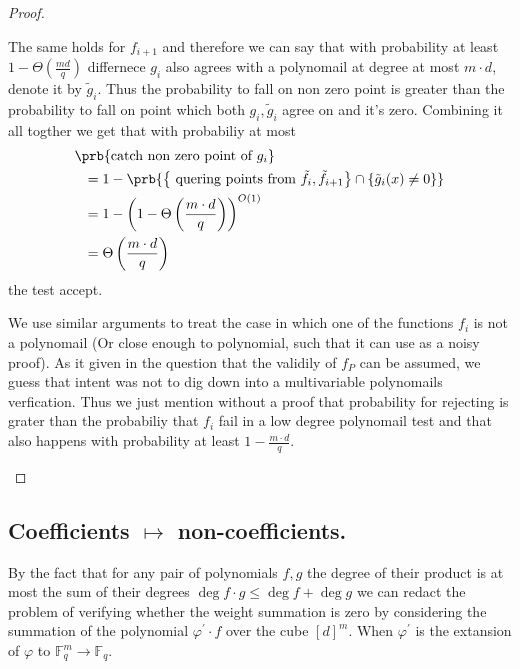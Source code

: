 \documentclass{article}
\newcommand{\FF}{\mathbb{F}_{q}}
\begin{document}
\begin{proof}
\begin{enumerate}
      The same holds for $f_{i+1}$ and therefore we can say that with probability at least $1 - \Theta(\frac{md}{q})$  differnece $g_{i}$ also agrees with a polynomail at degree at most $m\cdot d$, denote it by $\tilde{g}_{i}$. Thus the probability to fall on non zero point is greater than the probability to fall on point which both $g_{i},\tilde{g}_{i}$ agree on and it's zero. Combining it all togther we get that with probabiliy at most 
      \begin{equation*}
        \begin{split}
          & \prb{\text{catch non zero point of } g_{i}} \\
          & \ \ =  1 - \prb{ \left\{ \text{ quering points from } \tilde{f}_{i}, \tilde{f}_{i+1}  \right\} \cap \left\{  \tilde{g}_i(x) \neq 0 \right\} } \\
          & \ \ =  1 - \left( 1 - \Theta\left(\frac{m\cdot d}{q} \right) \right)^{O(1)} \\ 
          & \ \ = \Theta\left(\frac{m\cdot d}{q} \right)
        \end{split}
      \end{equation*}
    the test accept.


      We use similar arguments to treat the case in which one of the functions $f_{i}$ is not a polynomail (Or close enough to polynomial, such that it can use as a noisy proof). As it given in the question that the validily of $f_{P}$ can be assumed, we guess that intent was not to dig down into a multivariable polynomails verfication. Thus we just mention without a proof that probability for rejecting is grater than the probabiliy that $f_{i}$ fail in a low degree polynomail test and that also happens with probability at least $1 - \frac{m\cdot d}{q}$. 
  \end{enumerate}
\end{proof}

\subsection{ Coefficients $\mapsto$ non-coefficients. }
By the fact that for any pair of polynomials $f,g$ the degree of their product is at most the sum of their degrees  $\deg f \cdot g \le \deg f + \deg g$  we can redact the problem of verifying whether the weight summation is zero by considering the summation of the polynomial $\varphi^{\prime} \cdot f$ over the cube $[d]^{m}$. When $\varphi^{\prime}$ is the extansion of $\varphi$  to $\FF^{m} \rightarrow \FF$. 
\end{document}
